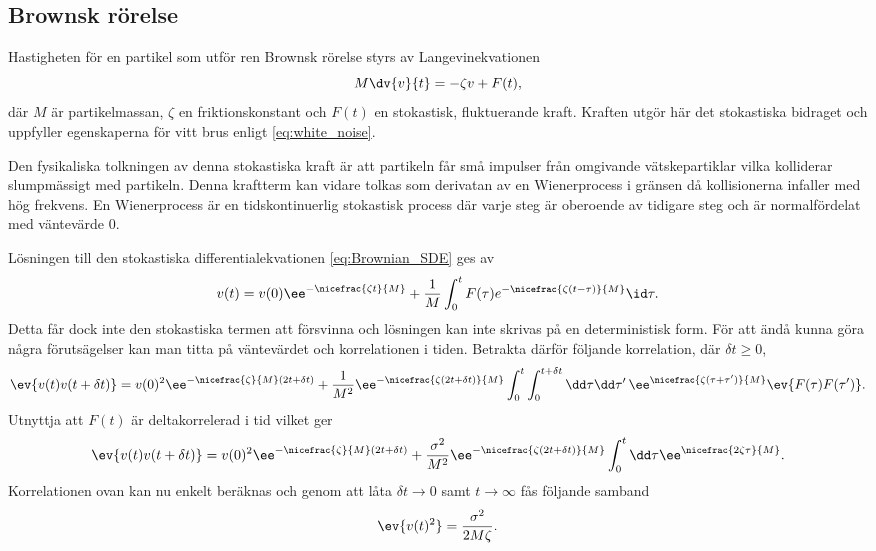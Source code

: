 




\subsection{Brownsk rörelse}\label{sec:brown}
Hastigheten för en partikel som utför ren Brownsk rörelse styrs av
Langevinekvationen~\cite{Mazo_Brownian2002} 
\begin{equation} \label{eq:Brownian_SDE}
    M\dv{v}{t}=-\zeta v + F(t),
\end{equation}
där $M$ är partikelmassan, $\zeta$ en friktionskonstant och $F(t)$ en
stokastisk, fluktuerande kraft. Kraften utgör här det stokastiska
bidraget och uppfyller egenskaperna för vitt brus enligt \eqref{eq:white_noise}.

Den fysikaliska tolkningen av denna stokastiska kraft är att partikeln
får små impulser från omgivande vätskepartiklar vilka kolliderar
slumpmässigt med partikeln.  
Denna kraftterm kan vidare tolkas som derivatan av en
Wienerprocess i gränsen då kollisionerna infaller med hög frekvens. En
Wienerprocess är en tidskontinuerlig stokastisk process där varje steg är oberoende av tidigare steg och är normalfördelat med väntevärde 0.

Lösningen till den stokastiska differentialekvationen
\eqref{eq:Brownian_SDE} ges av  
\begin{equation}
v(t)
=v(0)\ee^{-\nicefrac{\zeta t}{M}}
 +\frac{1}{M}\int^t_0 F(\tau)e^{-\nicefrac{\zeta (t-\tau)}{M}} \id\tau.
\end{equation}
Detta får dock inte den stokastiska termen att försvinna och lösningen kan inte skrivas på en deterministisk form. För att ändå kunna göra några förutsägelser kan man titta på väntevärdet och korrelationen i tiden. Betrakta därför följande korrelation, där $\delta t\geq0$,
\begin{equation}
\ev{v(t)v(t+\delta t)} 
= v(0)^2\ee^{-\nicefrac{\zeta}{M}(2t+\delta t)}
+ \frac{1}{M^2}\ee^{-\nicefrac{\zeta (2t+\delta t)}{M}}
  \int_0^t\int_0^{t+\delta t}\dd\tau\dd\tau'\, 
    \ee^{\nicefrac{\zeta (\tau+\tau')}{M}}\ev{F(\tau)F(\tau')}.
\end{equation}
Utnyttja att $F(t)$ är deltakorrelerad i tid vilket ger 
\begin{equation}
\ev{v(t)v(t+\delta t)} 
= v(0)^2\ee^{-\nicefrac{\zeta}{M}(2t+\delta t)}
 +\frac{\sigma^2}{M^2}\ee^{-\nicefrac{\zeta (2t+\delta t)}{M}}
  \int_0^t\dd\tau\ee^{\nicefrac{2\zeta \tau}{M}}.
\end{equation}
Korrelationen ovan kan nu enkelt beräknas och genom att låta $\delta t\to 0$ samt $t\to \infty$ fås följande samband
\begin{equation}
    \ev{v(t)^2} = \frac{\sigma^2}{2M\zeta}.
\end{equation}

